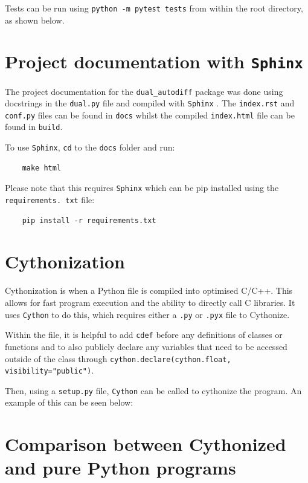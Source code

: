 \documentclass[11pt,a4paper]{article}
\begin{document}
Tests can be run using \texttt{python -m pytest tests} from within the root directory, as shown below.


\section{Project documentation with \texttt{\textbf{Sphinx}}}
The project documentation for the \texttt{dual\_autodiff} package was done using docstrings in the \texttt{dual.py} file and compiled with \texttt{Sphinx} \citep{brandl2021sphinx}. The \texttt{index.rst} and \texttt{conf.py} files can be found in \texttt{docs} whilst the compiled \texttt{index.html} file can be found in \texttt{build}.

To use \texttt{Sphinx}, \texttt{cd} to the \texttt{docs} folder and run:

\begin{lstlisting}
    make html
\end{lstlisting}

Please note that this requires \texttt{Sphinx} which can be pip installed using the \texttt{requirements. txt} file:

\begin{lstlisting}
    pip install -r requirements.txt
\end{lstlisting}
\section{Cythonization}
Cythonization \citep{behnel2011cython} is when a Python file is compiled into optimised C/C++. This allows for fast program execution and the ability to directly call C libraries. It uses \texttt{Cython} to do this, which requires either a \texttt{.py} or \texttt{.pyx} file to Cythonize.

Within the file, it is helpful to add \texttt{cdef} before any definitions of classes or functions and to also publicly declare any variables that need to be accessed outside of the class through \texttt{cython.declare(cython.float, visibility="public")}.

Then, using a \texttt{setup.py} file, \texttt{Cython} can be called to cythonize the program. An example of this can be seen below:



\section{Comparison between Cythonized and pure Python programs}
\end{document}
